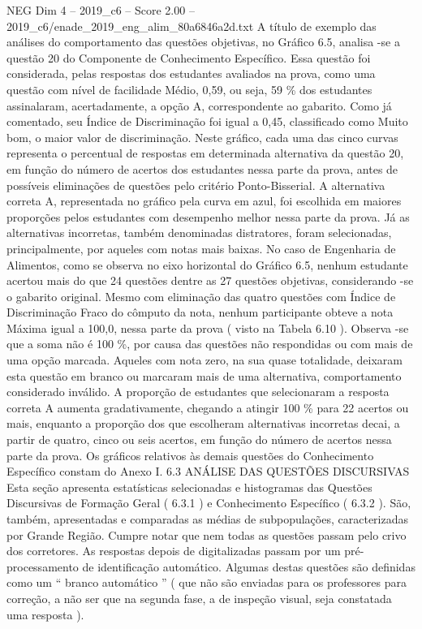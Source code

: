 \begin{textsample}{NEG Dim 4 – 2019\_c6 – Score 2.00 – 2019\_c6/enade\_2019\_eng\_alim\_80a6846a2d.txt}
A título de exemplo das análises do comportamento das questões objetivas, no Gráfico 6.5, analisa -se a questão 20 do Componente de Conhecimento Específico.
Essa questão foi considerada, pelas respostas dos estudantes avaliados na prova, como uma questão com nível de facilidade Médio, 0,59, ou seja, 59 \% dos estudantes assinalaram, acertadamente, a opção A, correspondente ao gabarito.
Como já comentado, seu Índice de Discriminação foi igual a 0,45, classificado como Muito bom, o maior valor de discriminação.
Neste gráfico, cada uma das cinco curvas representa o percentual de respostas em determinada alternativa da questão 20, em função do número de acertos dos estudantes nessa parte da prova, antes de possíveis eliminações de questões pelo critério Ponto-Bisserial.
A alternativa correta A, representada no gráfico pela curva em azul, foi escolhida em maiores proporções pelos estudantes com desempenho melhor nessa parte da prova.
Já as alternativas incorretas, também denominadas distratores, foram selecionadas, principalmente, por aqueles com notas mais baixas.
No caso de Engenharia de Alimentos, como se observa no eixo horizontal do Gráfico 6.5, nenhum estudante acertou mais do que 24 questões dentre as 27 questões objetivas, considerando -se o gabarito original.
Mesmo com eliminação das quatro questões com Índice de Discriminação Fraco do cômputo da nota, nenhum participante obteve a nota Máxima igual a 100,0, nessa parte da prova ( visto na Tabela 6.10 ).
Observa -se que a soma não é 100 \%, por causa das questões não respondidas ou com mais de uma opção marcada.
Aqueles com nota zero, na sua quase totalidade, deixaram esta questão em branco ou marcaram mais de uma alternativa, comportamento considerado inválido.
A proporção de estudantes que selecionaram a resposta correta A aumenta gradativamente, chegando a atingir 100 \% para 22 acertos ou mais, enquanto a proporção dos que escolheram alternativas incorretas decai, a partir de quatro, cinco ou seis acertos, em função do número de acertos nessa parte da prova.
Os gráficos relativos às demais questões do Conhecimento Específico constam do Anexo I. 6.3 ANÁLISE DAS QUESTÕES DISCURSIVAS Esta seção apresenta estatísticas selecionadas e histogramas das Questões Discursivas de Formação Geral ( 6.3.1 ) e Conhecimento Específico ( 6.3.2 ).
São, também, apresentadas e comparadas as médias de subpopulações, caracterizadas por Grande Região.
Cumpre notar que nem todas as questões passam pelo crivo dos corretores.
As respostas depois de digitalizadas passam por um pré-processamento de identificação automático.
Algumas destas questões são definidas como um “ branco automático ” ( que não são enviadas para os professores para correção, a não ser que na segunda fase, a de inspeção visual, seja constatada uma resposta ).

\end{textsample}
